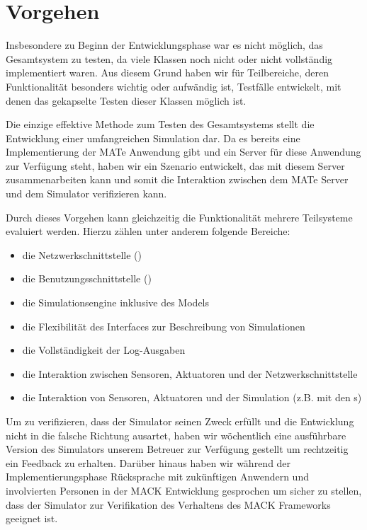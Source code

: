 \section{Vorgehen}\label{sec:eva_approach}
Insbesondere zu Beginn der Entwicklungsphase war es nicht möglich, das Gesamtsystem zu testen, da viele Klassen noch nicht oder nicht vollständig implementiert waren. Aus diesem Grund haben wir für Teilbereiche, deren Funktionalität besonders wichtig oder aufwändig ist, Testfälle entwickelt, mit denen das gekapselte Testen dieser Klassen möglich ist.

Die einzige effektive Methode zum Testen des Gesamtsystems stellt die Entwicklung einer umfangreichen Simulation dar. Da es bereits eine Implementierung der MATe Anwendung gibt und ein Server für diese Anwendung zur Verfügung steht, haben wir ein Szenario entwickelt, das mit diesem Server zusammenarbeiten kann und somit die Interaktion zwischen dem MATe Server und dem Simulator verifizieren kann.

Durch dieses Vorgehen kann gleichzeitig die Funktionalität mehrere Teilsysteme evaluiert werden. Hierzu zählen unter anderem folgende Bereiche:
\begin{itemize}
	\item die Netzwerkschnittstelle ()
	\item die Benutzungsschnittstelle ()
	\item die Simulationsengine inklusive des Models
	\item die Flexibilität des Interfaces zur Beschreibung von Simulationen
	\item die Vollständigkeit der Log-Ausgaben
	\item die Interaktion zwischen Sensoren, Aktuatoren und der Netzwerkschnittstelle
	\item die Interaktion von Sensoren, Aktuatoren und der Simulation (z.B. mit den s)
\end{itemize}

Um zu verifizieren, dass der Simulator seinen Zweck erfüllt und die Entwicklung nicht in die falsche Richtung ausartet, haben wir wöchentlich eine ausführbare Version des Simulators unserem Betreuer zur Verfügung gestellt um rechtzeitig ein Feedback zu erhalten. Darüber hinaus haben wir während der Implementierungsphase Rücksprache mit zukünftigen Anwendern und involvierten Personen  in der MACK Entwicklung gesprochen um sicher zu stellen, dass der Simulator zur Verifikation des Verhaltens des MACK Frameworks geeignet ist.

